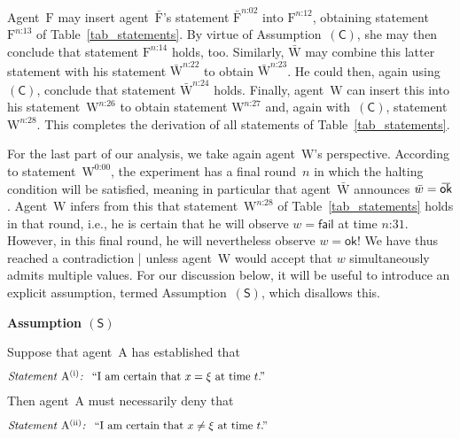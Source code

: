 \documentclass[12pt]{article}
\theoremstyle{mystyle}
\theoremstyle{definition}
\newcommand{\oline}[2]{{\mkern#2mu\overline{\protect\vphantom{t}\mkern-#2mu\smash{#1}\mkern-#2mu}\mkern#2mu}}
\newcommand*{\Friendone}{\mathrm{\bar{F}}}
\newcommand*{\Friendtwo}{\mathrm{F}}
\newcommand*{\Assistant}{\mathrm{\bar{W}}}
\newcommand*{\Wigner}{\mathrm{W}}
\newcommand*{\Agent}{\mathrm{A}}
\newcommand*{\wb}{\bar{w}}
\newcommand*{\SW}{\mathsf{(S)}}
\newcommand*{\SelfCons}{\mathsf{(C)}}
\newcommand*{\ok}{\mathsf{ok}}
\newcommand*{\fail}{\mathsf{fail}}
\newcommand*{\okb}{\oline{\ok}{2.8}}
\newcommand*{\asn}[1]{``#1''}
\newcommand*{\sT}[1]{{\text{\emph{Statement} $#1$\emph{:} }}}
\newcommand*{\sTM}[1]{\begin{minipage}{14cm} \hangindent=8.6em  #1 \end{minipage}}
\begin{document}
Agent~$\Friendtwo$ may insert agent~$\Friendone$'s statement $\Friendone^{\text{$n$:02}}$ into $\Friendtwo^{\text{$n$:12}}$, obtaining statement $\Friendtwo^{\text{$n$:13}}$ of Table~\ref{tab_statements}. By virtue of Assumption~$\SelfCons$, she may then conclude  that statement  $\Friendtwo^{\text{$n$:14}}$ holds, too.
Similarly, $\Assistant$  may combine this latter statement with his statement $\Assistant^{\text{$n$:22}}$ to obtain
$\Assistant^{\text{$n$:23}}$.  He could then, again using~$\SelfCons$, conclude that statement $\Assistant^{\text{$n$:24}}$ holds.  Finally, agent~$\Wigner$ can insert this into his statement~$\Wigner^{\text{$n$:26}}$ to obtain statement $\Wigner^{\text{$n$:27}}$ and, again with~$\SelfCons$, statement $\Wigner^{\text{$n$:28}}$. This completes the derivation of all statements of Table~\ref{tab_statements}. 

For the last part of our analysis, we take again agent~$\Wigner$'s perspective. According to statement~$\Wigner^{\text{0:00}}$, the experiment has a final round~$n$ in which the halting condition will be satisfied, meaning in particular that agent~$\Assistant$ announces $\wb = \okb$. Agent~$\Wigner$ infers from this that statement~$\Wigner^{\text{$n$:28}}$ of Table~\ref{tab_statements} holds in that round, i.e., he is certain that he will observe $w = \fail$ at time $\text{$n$:31}$. However, in this final round, he will nevertheless observe $w=\ok$! We have thus reached a contradiction | unless agent~$\Wigner$ would accept that $w$ simultaneously admits multiple values. For our discussion below, it will be useful to introduce an explicit assumption, termed Assumption~$\SW$, which disallows this.

\begin{emphbox}

  \noindent \textbf{Assumption $\SW$} 
  
   \smallskip 
  
\noindent Suppose that agent~$\Agent$ has established that \nsb
\begin{align*}
\sTM{\sT{{\Agent}^{\mathrm{(i)}}} \asn{I am certain that $x=\xi$ at time $t$.} }
\end{align*}
Then agent~$\Agent$ must necessarily deny that \nsb
\begin{align*}
\sTM{\sT{{\Agent}^{\mathrm{(ii)}}} \asn{I am certain  that $x \neq \xi$ at time $t$.}}
\end{align*}
\vspace{-4ex}
\end{emphbox}
\end{document}
